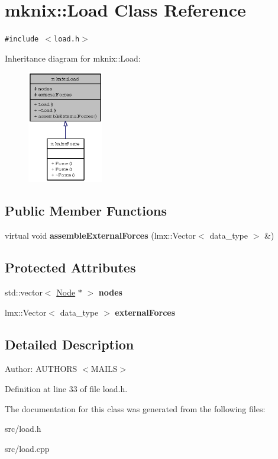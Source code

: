 \hypertarget{classmknix_1_1Load}{
\section{mknix::Load Class Reference}
\label{classmknix_1_1Load}
}
{\tt \#include $<$load.h$>$}

Inheritance diagram for mknix::Load:\nopagebreak
\begin{figure}[H]
\begin{center}
\leavevmode
\includegraphics[width=94pt]{classmknix_1_1Load__inherit__graph}
\end{center}
\end{figure}
\subsection*{Public Member Functions}
\begin{CompactItemize}
\item 
\hypertarget{classmknix_1_1Load_93aeafe41cb8ea7c97ae20b5870c5c9e}{
virtual void \textbf{assembleExternalForces} (lmx::Vector$<$ data\_\-type $>$ \&)}
\label{classmknix_1_1Load_93aeafe41cb8ea7c97ae20b5870c5c9e}

\end{CompactItemize}
\subsection*{Protected Attributes}
\begin{CompactItemize}
\item 
\hypertarget{classmknix_1_1Load_0cff22a8b9f289b38d978546160b6bb6}{
std::vector$<$ \hyperlink{classmknix_1_1Node}{Node} $\ast$ $>$ \textbf{nodes}}
\label{classmknix_1_1Load_0cff22a8b9f289b38d978546160b6bb6}

\item 
\hypertarget{classmknix_1_1Load_fbf0c36d2962e6bd85812ef7d498d314}{
lmx::Vector$<$ data\_\-type $>$ \textbf{externalForces}}
\label{classmknix_1_1Load_fbf0c36d2962e6bd85812ef7d498d314}

\end{CompactItemize}


\subsection{Detailed Description}
\begin{Desc}
\item[Author:]AUTHORS $<$MAILS$>$ \end{Desc}


Definition at line 33 of file load.h.

The documentation for this class was generated from the following files:\begin{CompactItemize}
\item 
src/load.h\item 
src/load.cpp\end{CompactItemize}
